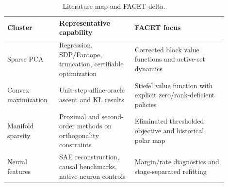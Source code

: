 \begin{table}[t]
\centering
\caption{Literature map and FACET delta.}
\label{tab:a-literature}
\small
\begin{tabular}{p{0.21\linewidth}p{0.31\linewidth}p{0.38\linewidth}}
\toprule
Cluster & Representative capability & FACET focus \\
\midrule
Sparse PCA & Regression, SDP/Fantope, truncation, certifiable optimization & Corrected block value functions and active-set dynamics \\
Convex maximization & Unit-step affine-oracle ascent and KŁ results & Stiefel value function with explicit zero/rank-deficient policies \\
Manifold sparsity & Proximal and second-order methods on orthogonality constraints & Eliminated thresholded objective and historical polar map \\
Neural features & SAE reconstruction, causal benchmarks, native-neuron controls & Margin/rate diagnostics and stage-separated refitting \\
\bottomrule
\end{tabular}
\end{table}
